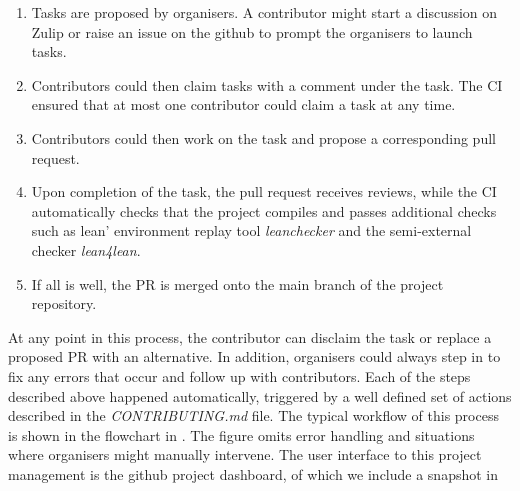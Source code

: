 \begin{enumerate}
    \item Tasks are proposed by organisers. A contributor might start a discussion on Zulip or raise an issue on the github to prompt the organisers to launch tasks.
    \item Contributors could then claim tasks with a comment under the task. The CI ensured that at most one contributor could claim a task at any time.
    \item Contributors could then work on the task and propose a corresponding pull request.
    \item Upon completion of the task, the pull request receives reviews, while the CI automatically checks that the project compiles and passes additional checks such as lean' environment replay tool \emph{leanchecker} and the semi-external checker \emph{lean4lean}\cite{carneiro2025lean4leanverifyingtypecheckerlean}.
    \item If all is well, the PR is merged onto the main branch of the project repository.
\end{enumerate}

At any point in this process, the contributor can disclaim the task or replace a proposed PR with an alternative. In addition, organisers could always step in to fix any errors that occur and follow up with contributors. Each of the steps described above happened automatically, triggered by a well defined set of actions described in the \emph{CONTRIBUTING.md} file. The typical workflow of this process is shown in the flowchart in . The figure omits error handling and situations where organisers might manually intervene. The user interface to this project management is the github project dashboard, of which we include a snapshot in 

